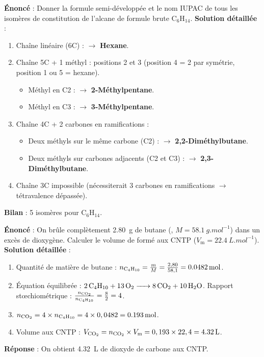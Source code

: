 \documentclass[11pt]{article}
\begin{document}
\begin{exoresolu}
\textbf{Énoncé} : Donner la formule semi-développée et le nom IUPAC de tous les isomères de constitution de l'alcane de formule brute $\mathrm{C_6H_{14}}$.
\textbf{Solution détaillée} :
\begin{enumerate}
  \item Chaîne linéaire (6C) :  $\to$ \textbf{Hexane}.
  \item Chaîne 5C + 1 méthyl : positions 2 et 3 (position 4 = 2 par symétrie, position 1 ou 5 = hexane).
    \begin{itemize}
      \item Méthyl en C2 :  $\to$ \textbf{2-Méthylpentane}.
      \item Méthyl en C3 :  $\to$ \textbf{3-Méthylpentane}.
    \end{itemize}
  \item Chaîne 4C + 2 carbones en ramifications :
    \begin{itemize}
      \item Deux méthyls sur le même carbone (C2) :  $\to$ \textbf{2,2-Diméthylbutane}.
      \item Deux méthyls sur carbones adjacents (C2 et C3) :  $\to$ \textbf{2,3-Diméthylbutane}.
    \end{itemize}
  \item Chaîne 3C impossible (nécessiterait 3 carbones en ramifications $\to$ tétravalence dépassée).
\end{enumerate}
\textbf{Bilan} : 5 isomères pour $\mathrm{C_6H_{14}}$.
\end{exoresolu}

\begin{exoresolu}
\textbf{Énoncé} : On brûle complètement \SI{2,80}{g} de butane (, $M = \SI{58,1}{g.mol^{-1}}$) dans un excès de dioxygène. Calculer le volume de  formé aux CNTP ($V_{\text{m}} = \SI{22,4}{L.mol^{-1}}$).
\textbf{Solution détaillée} :
\begin{enumerate}
  \item Quantité de matière de butane : $n_{\ce{C4H10}} = \frac{m}{M} = \frac{2,80}{58,1} = \SI{0,0482}{mol}$.
  \item Équation équilibrée : $\ce{2 C4H10 + 13 O2 -> 8 CO2 + 10 H2O}$.
    Rapport stœchiométrique : $\frac{n_{\ce{CO2}}}{n_{\ce{C4H10}}} = \frac{8}{2} = 4$.
  \item $n_{\ce{CO2}} = 4 \times n_{\ce{C4H10}} = 4 \times 0,0482 = \SI{0,193}{mol}$.
  \item Volume aux CNTP : $V_{\ce{CO2}} = n_{\ce{CO2}} \times V_{\text{m}} = 0,193 \times 22,4 = \SI{4,32}{L}$.
\end{enumerate}
\textbf{Réponse} : On obtient \SI{4,32}{L} de dioxyde de carbone aux CNTP.
\end{exoresolu}
\end{document}
